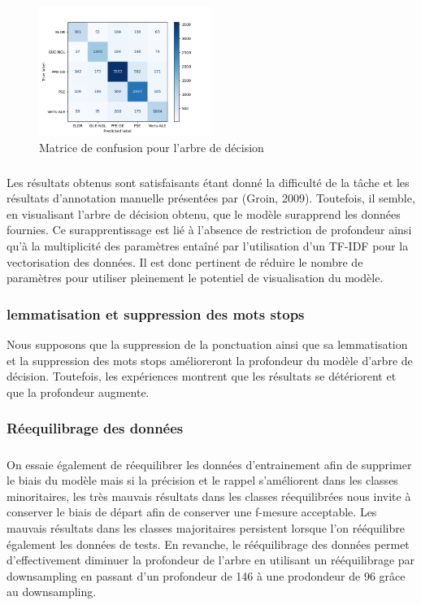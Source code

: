 \documentclass[11pt]{article}
\begin{document}
\begin{figure}[h]
\includegraphics[width=0.5\textwidth]{MatriceConfusionTree}
\caption{Matrice de confusion pour l'arbre de décision}
\centering
\end{figure}

\subparagraph{}
Les résultats obtenus sont satisfaisants étant donné la difficulté de la tâche et les résultats d'annotation manuelle présentées par (Groin, 2009). Toutefois, il semble, en visualisant l'arbre de décision obtenu, que le modèle surapprend les données fournies. Ce surapprentissage est lié à l'absence de restriction de profondeur ainsi qu'à la multiplicité des paramètres entaîné par l'utilisation d'un TF-IDF pour la vectorisation des données. Il est donc pertinent de réduire le nombre de paramètres pour utiliser pleinement le potentiel de visualisation du modèle.
\subsubsection{lemmatisation et suppression des mots stops}
Nous supposons que la suppression de la ponctuation ainsi que sa lemmatisation et la suppression des mots stops amélioreront la profondeur du modèle d'arbre de décision. Toutefois, les expériences montrent que les résultats se détériorent et que la profondeur augmente. 
\subsubsection{Réequilibrage des données}
\subparagraph{}
On essaie également de réequilibrer les données d'entrainement afin de supprimer le biais du modèle mais si la précision et le rappel s'améliorent dans les classes minoritaires, les très mauvais résultats dans les classes réequilibrées nous invite à conserver le biais de départ afin de conserver une f-mesure acceptable. Les mauvais résultats dans les classes majoritaires persistent lorsque l'on rééquilibre également les données de tests. En revanche, le rééquilibrage des données permet d'effectivement diminuer la profondeur de l'arbre en utilisant un rééquilibrage par downsampling en passant d'un profondeur de 146 à une prodondeur de 96 grâce au downsampling.
\end{document}
